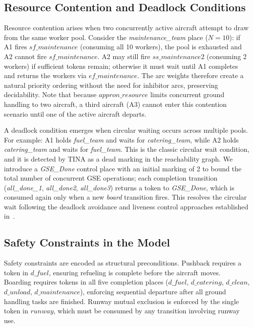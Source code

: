 \documentclass[conference]{IEEEtran}
\begin{document}
\subsection{Resource Contention and Deadlock Conditions}

Resource contention arises when two concurrently active aircraft attempt to draw
from the same worker pool. Consider the \textit{maintenance\_team} place
($N = 10$): if A1 fires $\mathit{sf\_maintenance}$ (consuming all 10 workers),
the pool is exhausted and A2 cannot fire $\mathit{sf\_maintenance}$. A2 may
still fire $\mathit{ss\_maintenance2}$ (consuming 2 workers) if sufficient
tokens remain; otherwise it must wait until A1 completes and returns the workers
via $\mathit{ef\_maintenance}$. The arc weights therefore create a natural
priority ordering without the need for inhibitor arcs, preserving decidability.
Note that because $\mathit{appron\_resource}$ limits concurrent ground handling
to two aircraft, a third aircraft (A3) cannot enter this contention scenario
until one of the active aircraft departs.

A deadlock condition emerges when circular waiting occurs across multiple pools.
For example: A1 holds \textit{fuel\_team} and waits for \textit{catering\_team},
while A2 holds \textit{catering\_team} and waits for \textit{fuel\_team}. This
is the classic circular wait condition, and it is detected by TINA as a dead
marking in the reachability graph. We introduce a \textit{GSE\_Done} control
place with an initial marking of 2 to bound the total number of concurrent GSE
operations; each completion transition (\textit{all\_done\_1},
\textit{all\_done2}, \textit{all\_done3}) returns a token to \textit{GSE\_Done},
which is consumed again only when a new \textit{board} transition fires. This
resolves the circular wait following the deadlock avoidance and liveness control
approaches established in~\cite{b4,b5}.

\subsection{Safety Constraints in the Model}

Safety constraints are encoded as structural preconditions. Pushback requires a
token in $\mathit{d\_fuel}$, ensuring refueling is complete before the aircraft
moves. Boarding requires tokens in all five completion places
($\mathit{d\_fuel}$, $\mathit{d\_catering}$, $\mathit{d\_clean}$,
$\mathit{d\_unload}$, $\mathit{d\_maintenance}$), enforcing sequential departure
after all ground handling tasks are finished. Runway mutual exclusion is enforced
by the single token in $\mathit{runway}$, which must be consumed by any
transition involving runway use.
\end{document}
